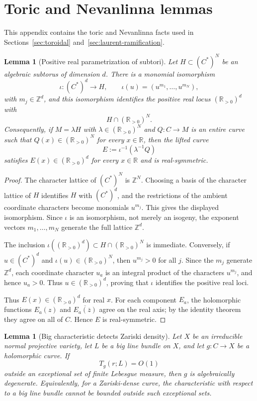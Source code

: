 \documentclass[11pt]{amsart}
\def\CC{C}%
\numberwithin{equation}{section}
\newtheorem{lemma}[theorem]{Lemma}
\theoremstyle{definition}
\theoremstyle{remark}
\newcommand{\CC}{\mathbb C}
\newcommand{\RR}{\mathbb R}
\newcommand{\ZZ}{\mathbb Z}
\begin{document}
\appendix
\section{Toric and Nevanlinna lemmas}
\label{app:technical}

This appendix contains the toric and Nevanlinna facts used in Sections~\ref{sec:toroidal} and~\ref{sec:laurent-ramification}.

\begin{lemma}[Positive real parametrization of subtori]\label{lem:appendix-positive-real}
Let $H\subset (\CC^*)^N$ be an algebraic subtorus of dimension $d$. There is a monomial isomorphism
\[
\iota:(\CC^*)^d\longrightarrow H,
\qquad
\iota(u)=(u^{m_1},\dots,u^{m_N}),
\]
with $m_j\in\ZZ^d$, and this isomorphism identifies the positive real locus $(\RR_{>0})^d$ with
\[
H\cap(\RR_{>0})^N.
\]
Consequently, if $M=\lambda H$ with $\lambda\in(\RR_{>0})^N$ and $Q:\CC\to M$ is an entire curve such that $Q(x)\in(\RR_{>0})^N$ for every $x\in\RR$, then the lifted curve
\[
E:=\iota^{-1}(\lambda^{-1}Q)
\]
satisfies $E(x)\in(\RR_{>0})^d$ for every $x\in\RR$ and is real-symmetric.
\end{lemma}

\begin{proof}
The character lattice of $(\CC^*)^N$ is $\ZZ^N$. Choosing a basis of the character lattice of $H$ identifies $H$ with $(\CC^*)^d$, and the restrictions of the ambient coordinate characters become monomials $u^{m_j}$. This gives the displayed isomorphism.  Since $\iota$ is an isomorphism, not merely an isogeny, the exponent vectors $m_1,\ldots,m_N$ generate the full lattice $\ZZ^d$.

The inclusion $\iota((\RR_{>0})^d)\subset H\cap(\RR_{>0})^N$ is immediate.  Conversely, if $u\in(\CC^*)^d$ and $\iota(u)\in(\RR_{>0})^N$, then $u^{m_j}>0$ for all $j$.  Since the $m_j$ generate $\ZZ^d$, each coordinate character $u_a$ is an integral product of the characters $u^{m_j}$, and hence $u_a>0$.  Thus $u\in(\RR_{>0})^d$, proving that $\iota$ identifies the positive real loci.

Thus $E(x)\in(\RR_{>0})^d$ for real $x$. For each component $E_a$, the holomorphic functions $E_a(z)$ and $\overline{E_a(\overline z)}$ agree on the real axis; by the identity theorem they agree on all of $\CC$. Hence $E$ is real-symmetric.
\end{proof}


\begin{lemma}[Big characteristic detects Zariski density]\label{lem:appendix-big-characteristic}
Let $X$ be an irreducible normal projective variety, let $L$ be a big line bundle on $X$, and let
$g:\CC\to X$ be a holomorphic curve.  If
\begin{equation*}
T_g(r;L)=O(1)
\end{equation*}
outside an exceptional set of finite Lebesgue measure, then $g$ is algebraically degenerate.  Equivalently, for a Zariski-dense curve, the characteristic with respect to a big line bundle cannot be bounded outside such exceptional sets.
\end{lemma}
\end{document}
